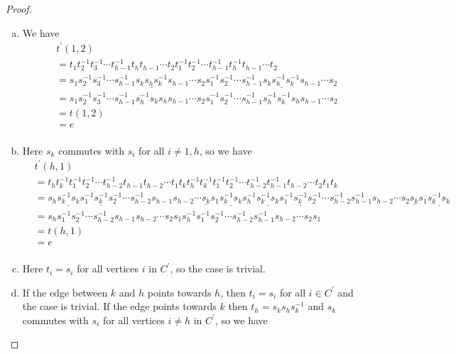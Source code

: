 \documentclass[11pt]{amsart}
\theoremstyle{definition}
\begin{document}
\begin{proof}
\begin{enumerate}[a)]
\item We have
\begin{align*}
&t^\prime(1,2)\\
&= t_1t_2^{-1}t_3^{-1}\cdots t_{h-1}^{-1}t_ht_{h-1}\cdots t_2t_1^{-1}t_2^{-1}\cdots t_{h-1}^{-1}t_h^{-1}t_{h-1}\cdots t_2\\
&= s_1s_2^{-1}s_3^{-1}\cdots s_{h-1}^{-1}\underline{s_ks_hs_k^{-1}}s_{h-1}\cdots s_2s_1^{-1}s_2^{-1}\cdots s_{h-1}^{-1}\underline{s_ks_h^{-1}s_k^{-1}}s_{h-1}\cdots s_2\\
&= s_1s_2^{-1}s_3^{-1}\cdots s_{h-1}^{-1}s_h^{-1}s_ks_hs_{h-1}\cdots s_2s_1^{-1}s_2^{-1}\cdots s_{h-1}^{-1}s_h^{-1}s_k^{-1}s_hs_{h-1}\cdots s_2\\
&= t(1,2)\\
&= e\\
\end{align*}

\item Here $s_k$ commutes with $s_i$ for all $i\ne 1,h$, so we have
\begin{align*}
& t^\prime(h,1)\\
&= t_ht_k^{-1}t_1^{-1}t_2^{-1}\cdots t_{h-2}^{-1}t_{h-1}t_{h-2}\cdots t_1t_kt_h^{-1}t_k^{-1}t_1^{-1}t_2^{-1}\cdots t_{h-2}^{-1}t_{h-1}^{-1}t_{h-2}\cdots t_2t_1t_k\\
&= s_h\underline{s_k^{-1}s_k}s_1^{-1}\underline{s_k^{-1}}s_2^{-1}\cdots s_{h-2}^{-1}s_{h-1}s_{h-2}\cdots \underline{s_k}s_1\underline{s_k^{-1}s_k}s_h^{-1}\underline{s_k^{-1}s_k}s_1^{-1}\underline{s_k^{-1}}s_2^{-1}\cdots s_{h-2}^{-1}s_{h-1}^{-1}s_{h-2}\cdots s_2 \underline{s_k}s_1\underline{s_k^{-1}s_k}\\
&= s_hs_1^{-1}s_2^{-1}\cdots s_{h-2}^{-1}s_{h-1}s_{h-2}\cdots s_2s_1s_h^{-1}s_1^{-1}s_2^{-1}\cdots s_{h-2}^{-1}s_{h-1}^{-1}s_{h-2}\cdots s_2s_1\\
&= t(h,1)\\
&= e\\
\end{align*}

\item Here $t_i = s_i$ for all vertices $i$ in $C^\prime$, so the case is trivial.

\item  If the edge between $k$ and $h$ points towards $h$, then $t_i = s_i$ for all $i\in C^\prime$ and the case is trivial.  If the edge points towards $k$ then $t_h = s_ks_hs_k^{-1}$ and $s_k$ commutes with $s_i$ for all vertices $i\ne h$ in $C^\prime$, so we have


\end{enumerate}
\end{proof}
\end{document}
